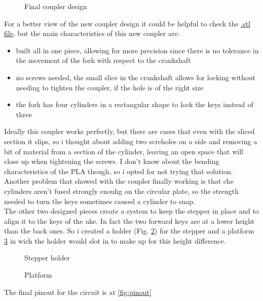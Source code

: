 \documentclass[a4paper,12pt]{article}
\begin{document}
\begin{multicols}{2}
\begin{figure}[H]
    \centering
    \caption{Final coupler design}
    \label{fig:grabnew}
\end{figure}
For a better view of the new coupler design it could be helpful to check the \href{https://github.com/Prop4et/LoM_Uketuner/blob/master/3D/grabnew.stl}{.stl file}, but the main characteristics of this new coupler are:
\begin{itemize}
    \item built all in one piece, allowing for more precision since there is no tolerance in the movement of the fork with respect to the crankshaft 
    \item no screws needed, the small slice in the crankshaft allows for locking without needing to tighten the coupler, if the hole is of the right size
    \item the fork has four cylinders in a rectangular shape to lock the keys instead of three
\end{itemize}
Ideally this coupler works perfectly, but there are cases that even with the sliced section it slips, so i thought about adding two screholes on a side and removing a bit of material from a section of the cylinder, leaving an open space that will close up when tightening the screws. I don't know about the bending characteristics of the PLA though, so i opted for not trying that solution.\\
Another problem that showed with the coupler finally working is that che cylinders aren't fused strongly enouhg on the circular plate, so the strength needed to turn the keys sometimes caused a cylinder to snap.\\
The other two designed pieces create a system to keep the stepper in place and to align it to the keys of the uke. In fact the two forward keys are at a lower height than the back ones. So i created a holder (Fig. \ref{fig:holder}) for the stepper and a platform \ref{fig:platform} in wich the holder would slot in to make up for this height difference.
\begin{figure}[H]
    \centering
    \caption{Stepper holder}
    \label{fig:holder}
\end{figure}\begin{figure}[H]
    \centering
    \caption{Platform}
    \label{fig:platform}
\end{figure}
The final pinout for the circuit is at \ref{fig:pinout}

\end{multicols}
\end{document}

